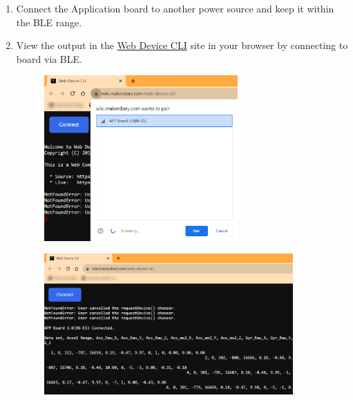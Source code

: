 \documentclass{article}
\begin{document}
\begin{enumerate}
	\item Connect the Application board to another power source and keep it within the BLE range.
	\item View the output in the \href{https://wiki.makerdiary.com/web-device-cli/}{Web Device CLI} site in your browser by connecting to board via BLE.
	\begin{figure}[H]
		\begin{center}
			\includegraphics[width=0.7\textwidth]{coinesAPI_images/Mcu_example_ble_pair.png}
		\end{center}
	\end{figure}
	\begin{figure}[H]
		\begin{center}
			\includegraphics[width=0.9\textwidth]{coinesAPI_images/Mcu_example_ble_output.png}
		\end{center}
	\end{figure}
\end{enumerate}
\end{document}
